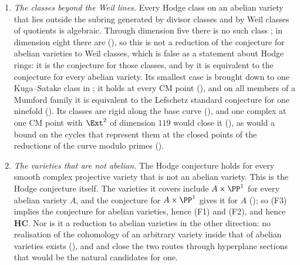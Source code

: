 \begin{corollary}
\begin{enumerate}[label=\textup{(F\arabic*)},leftmargin=3.0em,itemsep=4pt]
  \cite[Theorem~3.9]{paperII} computes the number that $\dim\Ext^{2}(E,E)$ has
  to reach, $7n^{2}-2n$ for a general shape. For one family its
  conclusion is equivalent to the Lefschetz standard conjecture for one
  variety (). The bounded criterion \textup{(P1)} is not a
  second form of the same demand: by
  \cite[Theorem~16.17]{paperI} it is equivalent to the conclusion it was to imply,
  and \cite[Theorem~16.15]{paperI} shows that the one cycle it could have been tested
  on, the transport of the base cycle, does not satisfy it.
\item \emph{The classes beyond the Weil lines.} Every Hodge class on an
  abelian variety that lies outside the subring generated by divisor classes
  and by Weil classes of quotients is algebraic. Through dimension five there
  is no such class \cite{MZ99}; in dimension eight there are
  (), so this is not a reduction of the conjecture
  for abelian varieties to Weil classes, which is false as a statement about
  Hodge rings: it is the conjecture for those classes, and by
   it is equivalent to the conjecture for every abelian
  variety. Its smallest case is
  brought down to one Kuga--Satake class in ; it holds at
  every CM point (), and on all members of a Mumford
  family it is equivalent to the Lefschetz standard conjecture for one
  ninefold (). Its classes are rigid along the base
  curve (), and one complex at one CM point with
  $\Ext^{2}$ of dimension $119$ would close it (),
  as would a bound on the cycles that represent them at the closed points of
  the reductions of the curve modulo primes ().
\item \emph{The varieties that are not abelian.} The Hodge conjecture holds
  for every smooth complex projective variety that is not an abelian variety.
  This is the Hodge conjecture itself. The varieties it covers include
  $A\times\PP^{1}$ for every abelian variety $A$, and the conjecture for
  $A\times\PP^{1}$ gives it for $A$ (); so (F3) implies
  the conjecture for abelian varieties, hence (F1) and (F2), and hence
  $\mathbf{HC}$. Nor is it a reduction to abelian varieties in the other
  direction: no realisation of the cohomology of an arbitrary variety inside
  that of abelian varieties exists (), and
  \cite[Theorem~10.3]{paperI} and \cite[Theorem~10.8]{paperI} close the two routes
  through hyperplane sections that would be the natural candidates for one.
\end{enumerate}
\end{corollary}

